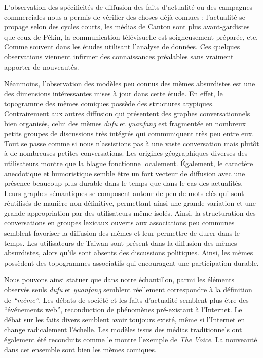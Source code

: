 L'observation des spécificités de diffusion des faits d'actualité ou des campagnes commerciales nous a permis de vérifier des choses déjà connues : l'actualité se propage selon des cycles courts, les médias de Canton sont plus avant-gardistes que ceux de Pékin, la communication télévisuelle est soigneusement préparée, etc. Comme souvent dans les études utilisant l'analyse de données. Ces quelques observations viennent infirmer des connaissances préalables sans vraiment apporter de nouveautés. 

Néanmoins, l'observation des modèles peu connus des mèmes absurdistes est une des dimensions intéressantes mises à jour dans cette étude. En effet, le topogramme des mèmes comiques possède des structures atypiques. Contrairement aux autres diffusion qui présentent des graphes conversationnels bien organisés, celui des mèmes \textit{dufu} et \textit{yuanfang} est fragmentée en nombreux petits groupes de discussions très intégrés qui communiquent très peu entre eux. Tout se passe comme si nous n'assistions pas à une vaste conversation mais plutôt à de nombreuses petites conversations. Les origines géographiques diverses des utilisateurs montre que la blague fonctionne localement. Également, le caractère anecdotique et humoristique semble être un fort vecteur de diffusion avec une présence beaucoup plus durable dans le temps que dans le cas des actualités. Leurs graphes sémantiques se composent autour de peu de mots-clés qui sont réutilisés de manière non-définitive, permettant ainsi une grande variation et une grande appropriation par des utilisateurs même isolés. Ainsi, la structuration des conversations en groupes lexicaux ouverts aux associations peu communes semblent favoriser la diffusion des mèmes et leur permettre de durer dans le temps. Les utilisateurs de Taiwan sont présent dans la diffusion des mèmes absurdistes, alors qu'ils sont absents des discussions politiques. Ainsi, les mèmes possèdent des topogrammes associatifs qui encouragent une participation durable.

Nous pouvons ainsi statuer que dans notre échantillon, parmi les éléments observés seuls \textit{dufu} et \textit{yuanfang} semblent réellement correspondre à la définition de \textit{``mème''}. Les débats de société et les faits d'actualité semblent plus être des ``événements web'', reconduction de phénomènes pré-existant à l'Internet. Le débat  sur les faits divers semblent avoir toujours existé, même si l'Internet en change radicalement l'échelle. Les modèles issus des médias traditionnels ont également été reconduits comme le montre l'exemple de \textit{The Voice}. La nouveauté dans cet ensemble sont bien les mèmes comiques. 

